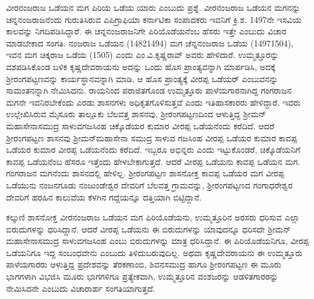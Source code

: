 ವೀರನಂಜರಾಜ ಒಡೆಯನ ಮಗ ಪಿರಿಯ ಒಡೆಯ ಯಾರು ಎಂಬುದು ಪ್ರಶ್ನೆ. ವೀರನಂಜರಾಜ ಒಡೆಯನ ಮಗನನ್ನು ಚನ್ನನಂಜರಾಜನೆಂದು ಗುರುತಿಸಿರುವ ಎಪಿಗ್ರಾಫಿಯಾ ಕರ್ನಾಟಿಕಾ ಸಂಪಾದಕರು ಇವನಿಗೆ ಕ್ರಿ.ಶ. 1497ನೇ ಇಸವಿಯ ಕಾಲವನ್ನು ನಿಗದಿಪಡಿಸಿದ್ದಾರೆ. ಈ ಚನ್ನನಂಜರಾಜನಿಗೇ ಪಿರಿಯೊಡೆಯನೆಂಬ ಹೆಸರು ಇತ್ತೇ ಎಂಬುದು ವಿಚಾರ ಮಾಡಬೇಕಾದ ಸಂಗತಿ. ನಂಜರಾಜ ಒಡೆಯನ (1482\enginline{-}1494) ಮಗ ಚೆನ್ನನಂಜರಾಜ ಒಡೆಯ (1497\enginline{-}1504), ಇವನ ಮಗ ಚಿಕ್ಕರಾಜ ಒಡೆಯ (1505) ಎಂದು ಎಂ.ವಿ.ಕೃಷ್ಣರಾವ್​ ಅವರು ಹೇಳಿದಾರೆ. ಉಮ್ಮತ್ತೂರನ್ನು ವಶಪಡಿಸಿಕೊಂಡ ಬಳಿಕ ಕೃಷ್ಣದೇವರಾಯನು ಅದನ್ನು ಒಂದು ಹೊಸ ಪ್ರಾಂತ್ಯವನ್ನಾಗಿ ಮಾರ್ಪಡಿಸಿ, ಅದಕ್ಕೆ ಶ‍್ರೀರಂಗಪಟ್ಟಣವನ್ನು ಕಾರ್ಯಸ್ಥಾನವನ್ನಾಗಿ ಮಾಡಿ, ಆ ಹೊಸ ಪ್ರಾಂತ್ಯಕ್ಕೆ ವೀರಪ್ಪ ಒಡೆಯರ್​ ಎಂಬುವನನ್ನು ಸಾಮಂತನನ್ನಾಗಿ ನೇಮಿಸಿದನು. ರಾಯನಿಂದ ಪರಾಜಿತಗೊಂಡ ಉಮ್ಮತ್ತೂರು ಪಾಳೆಯಗಾರನಾಗಿದ್ದ ಗಂಗರಾಜನ ಮಗನೇ ಇವನಿರಬೇಕೆಂದು ಎರಡು ಶಾಸನಗಳು ಅಧಿಕೃತಗೊಳಿಸುತ್ತವೆ ಎಂದು ಇತಿಹಾಸಕಾರರು ಹೇಳಿದ್ದಾರೆ. ಇವರು ಉಲ್ಲೇಖಿಸಿರುವ ಮೈಸೂರು ತಾಲ್ಲೂಕು ಬೆಲವತ್ತ ಶಾಸನವು, ಶ‍್ರೀರಂಗಪಟ್ಟಣದಿಂದ ಆಳುತ್ತಿದ್ದ ಶ‍್ರೀಮನ್​ ಮಹಾಸೇನಾಸಮುದ್ರ ಸಾಳುವಗಜಸಿಂಹ ಚಿಕ್ಕೊಡೆಯರ ಕುಮಾರ ವೀರಪ್ಪ ಒಡೆಯನೆಂದು ಕರೆದಿದೆ. ಆದರೆ ಶ‍್ರೀರಂಗಪಟ್ಟಣ ಶಾಸನವು ಶ‍್ರೀಮನ್​ ಮಹಾಸೇನಾ ಸಮುದ್ರ ಸಾಳುವ ಗಜಸಿಂಹ ವೀರಪ್ಪ ಒಡೆಯರ ಕುಮಾರ ಕಾವಪ್ಪ ಒಡೆಯರ ಕುಮಾರ ವೀರಪ್ಪ ಒಡೆಯನೆಂದು ಕರೆದಿದೆ. ಇಬ್ಬರೂ ಅಭಿನ್ನರು ಎಂದು ಇಟ್ಟುಕೊಂಡರೆ, ಚಿಕ್ಕೊಡೆಯನಿಗೆ ಕಾವಪ್ಪ ಒಡೆಯನೆಂಬ ಹೆಸರೂ ಇತ್ತೆಂದು ಹೇಳಬೇಕಾಗುತ್ತದೆ. ಆದರೆ ವೀರಪ್ಪ ಒಡೆಯನು ಕಾವಪ್ಪ ಒಡೆಯನ ಮಗ. ಗಂಗರಾಜನ ಮಗನೆಂದು ಶಾಸನದಲ್ಲಿ ಹೇಳಿಲ್ಲ. ಶ‍್ರೀರಂಗಪಟ್ಟಣ ಶಾಸನೋಕ್ತ ಕಾವಪ್ಪ ಒಡೆಯರ ಮಗ ವೀರಪ್ಪ ಒಡೆಯುನು ನಂಜನಗೂಡು ನಂಜುಂಡೇಶ್ವರ ದೇವರಿಗೆ ಬೆಲವತ್ತ ಗ್ರಾಮವನ್ನು, ಶ‍್ರೀರಂಗಪಟ್ಟಣದ ಗಂಗಾಧರೇಶ್ವರ ದೇವರಿಗೆ ಹರಹಿನ ಕಾಲುವೆಯ ಕೆಳಗಿನ ಗದ್ದೆಯನ್ನೂ ದತ್ತಿಯಾಗಿ ಬಿಟ್ಟಿದ್ದಾನೆ.

ಕಲ್ಕುಣಿ ಶಾಸನೋಕ್ತ ವೀರನಂಜರಾಜ ಒಡೆಯನ ಮಗ ಪಿರಿಯೊಡೆಯನು, ಉಮ್ಮತ್ತೂರಿನ ಅರಸರು ಧರಿಸುವ ಎಲ್ಲಾ ಬಿರುದುಗಳನ್ನು ಧರಿಸಿದ್ದಾನೆ. ಆದರೆ ವೀರಪ್ಪ ಒಡೆಯನು ಈ ಬಿರುದುಗಳನ್ನು ಯಾವುದನ್ನೂ ಧರಿಸದೇ ಶ‍್ರೀಮನ್​ ಮಹಾಸೇನಾಸಮುದ್ರ ಸಾಳುವಗಜಸಿಂಹ ಎಂಬು ಬಿರುದುಗಳನ್ನು ಮಾತ್ರ ಧರಿಸಿದ್ದಾನೆ. ಈ ಪಿರಿಯೊಡೆಯನಿಗೂ, ವೀರಪ್ಪ ಒಡೆಯನಿಗೂ ಇದ್ದ ಸಂಬಂಧವೇನು ಎಂಬುದು ತಿಳಿದುಬರುವುದಿಲ್ಲ. ಅಥವಾ ಕೃಷ್ಣದೇವರಾಯನು ಈ ಉಮ್ಮತ್ತೂರು ಪಾಳೆಯಗಾರರು ಆಳುತ್ತಿದ್ದ ಪ್ರದೇಶವನ್ನು ತೆರಕಣಾಂಬಿ, ಶಿವನಸಮುದ್ರ ಹಾಗೂ ಶ‍್ರೀರಂಗಪಟ್ಟಣ ಈ ಮೂರು ಭಾಗಗಳಾಗಿ ವಿಭಜಿಸಿ ಮೂರು ಭಾಗಗಳಿಗೂ ಪ್ರತ್ಯೇಕವಾಗಿ, ಉಮ್ಮತ್ತೂರಿನ ವಂಶಜರನ್ನು ಆಡಳಿತಗಾರರನ್ನು ನೇಮಿಸಿದನೇ ಎಂಬುದು ವಿಚಾರಾರ್ಹ ಸಂಗತಿಯಾಗುತ್ತದೆ.

